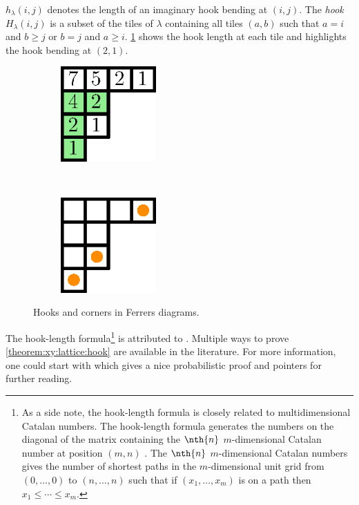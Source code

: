 \(h_{\lambda}(i,j)\) denotes the length of an imaginary hook bending at
\((i,j)\). The \emph{hook} \(H_{\lambda}(i,j)\) is a subset of the tiles of
\(\lambda\) containing all tiles \((a,b)\) such that \(a = i\) and \(b \ge j\)
or \(b = j\) and \(a \ge i\). \ref{fig:xy:lattice:hooks} shows the hook length
at each tile and highlights the hook bending at \((2,1)\).

\begin{figure}
\centering
\begin{subfigure}[t]{0.47\textwidth}
\centering
	\includegraphics[width=0.4\textwidth]{fig/x+y/lattice/hooks}
	\label{fig:xy:lattice:hooks}
\end{subfigure}
~
\begin{subfigure}[t]{0.47\textwidth}
\centering
	\includegraphics[width=0.4\textwidth]{fig/x+y/lattice/corners}
	\label{fig:xy:lattice:corners}
\end{subfigure}
\caption{Hooks and corners in Ferrers diagrams.}
\end{figure}

The hook-length formula\footnote{
As a side note, the hook-length formula is closely related to
multidimensional Catalan numbers. The hook-length formula generates the numbers
on the diagonal of the matrix containing the \(\nth{n}\) \(m\)-dimensional
Catalan number at position \((m,n)\) \cite{OEIS:A060854}. The \(\nth{n}\)
\(m\)-dimensional Catalan numbers gives the number of shortest paths in the
\(m\)-dimensional unit grid from \( (0,\ldots,0) \) to \( (n,\ldots,n) \) such
that if \( (x_1,\ldots,x_m) \) is on a path then \( x_1 \le \cdots \le x_m\).
}
is attributed to \citet*{frame:1954}. Multiple ways to
prove \ref{theorem:xy:lattice:hook} are available in the literature. For more
information, one could start with \citet*{greene:1979} which gives a nice
probabilistic proof and pointers for further reading.

